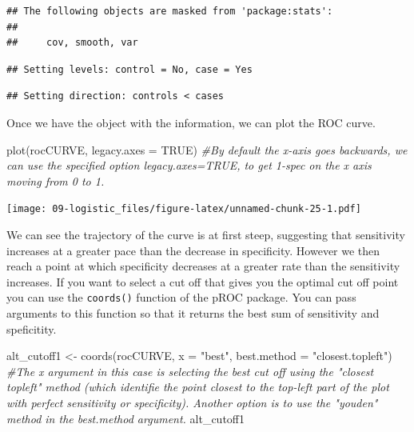 \documentclass[
]{book}
\newenvironment{Shaded}{\begin{snugshade}}{\end{snugshade}}
\newcommand{\AttributeTok}[1]{\textcolor[rgb]{0.77,0.63,0.00}{#1}}
\newcommand{\CommentTok}[1]{\textcolor[rgb]{0.56,0.35,0.01}{\textit{#1}}}
\newcommand{\ConstantTok}[1]{\textcolor[rgb]{0.00,0.00,0.00}{#1}}
\newcommand{\FunctionTok}[1]{\textcolor[rgb]{0.00,0.00,0.00}{#1}}
\newcommand{\NormalTok}[1]{#1}
\newcommand{\OtherTok}[1]{\textcolor[rgb]{0.56,0.35,0.01}{#1}}
\newcommand{\SpecialCharTok}[1]{\textcolor[rgb]{0.00,0.00,0.00}{#1}}
\newcommand{\StringTok}[1]{\textcolor[rgb]{0.31,0.60,0.02}{#1}}
\begin{document}
\begin{verbatim}
## The following objects are masked from 'package:stats':
## 
##     cov, smooth, var
\end{verbatim}

\begin{Shaded}
\end{Shaded}

\begin{verbatim}
## Setting levels: control = No, case = Yes
\end{verbatim}

\begin{verbatim}
## Setting direction: controls < cases
\end{verbatim}

Once we have the object with the information, we can plot the ROC curve.

\begin{Shaded}
\begin{Highlighting}[]
\FunctionTok{plot}\NormalTok{(rocCURVE, }\AttributeTok{legacy.axes =} \ConstantTok{TRUE}\NormalTok{) }\CommentTok{\#By default the x{-}axis goes backwards, we can use the specified option legacy.axes=TRUE, to get 1{-}spec on the x axis moving from 0 to 1.}
\end{Highlighting}
\end{Shaded}

\texttt{[image: 09-logistic\_files/figure-latex/unnamed-chunk-25-1.pdf]}

We can see the trajectory of the curve is at first steep, suggesting that sensitivity increases at a greater pace than the decrease in specificity. However we then reach a point at which specificity decreases at a greater rate than the sensitivity increases. If you want to select a cut off that gives you the optimal cut off point you can use the \texttt{coords()} function of the pROC package. You can pass arguments to this function so that it returns the best sum of sensitivity and speficitity.

\begin{Shaded}
\begin{Highlighting}[]
\NormalTok{alt\_cutoff1 }\OtherTok{\textless{}{-}} \FunctionTok{coords}\NormalTok{(rocCURVE, }\AttributeTok{x =} \StringTok{"best"}\NormalTok{, }\AttributeTok{best.method =} \StringTok{"closest.topleft"}\NormalTok{)}
\CommentTok{\#The x argument in this case is selecting the best cut off using the "closest topleft" method (which identifie the point closest to the top{-}left part of the plot with perfect sensitivity or specificity). Another option is to use the "youden" method in the best.method argument.}
\NormalTok{alt\_cutoff1}
\end{Highlighting}
\end{Shaded}
\end{document}
